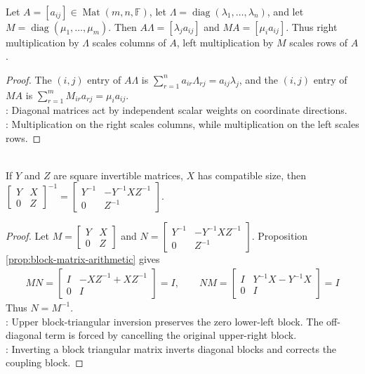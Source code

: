 \begin{proposition} \label{prop:diagonal-multiplication-scales-rows-columns} \\
Let $A=[a_{ij}]\in\operatorname{Mat}(m,n,\mathbb{F})$, let $\Lambda=\operatorname{diag}(\lambda_1,\ldots,\lambda_n)$, and let $M=\operatorname{diag}(\mu_1,\ldots,\mu_m)$. Then $A\Lambda=[\lambda_j a_{ij}]$ and $MA=[\mu_i a_{ij}]$. Thus right multiplication by $\Lambda$ scales columns of $A$, left multiplication by $M$ scales rows of $A$.
\begin{proof}
The $(i,j)$ entry of $A\Lambda$ is $\sum_{r=1}^n a_{ir}\Lambda_{rj}=a_{ij}\lambda_j$, and the $(i,j)$ entry of $MA$ is $\sum_{r=1}^m M_{ir}a_{rj}=\mu_i a_{ij}$.\\
: Diagonal matrices act by independent scalar weights on coordinate directions.\\
: Multiplication on the right scales columns, while multiplication on the left scales rows.
\end{proof}
\end{proposition}

\begin{proposition} \label{prop:block-upper-triangular-inverse} \\
If $Y$ and $Z$ are square invertible matrices, $X$ has compatible size, then $\begin{bmatrix}
Y & X\\
0 & Z
\end{bmatrix}^{-1}
=
\begin{bmatrix}
Y^{-1} & -Y^{-1}XZ^{-1}\\
0 & Z^{-1}
\end{bmatrix}$.
\begin{proof}
Let $M=\begin{bmatrix}Y&X\\0&Z\end{bmatrix}$ and $N=\begin{bmatrix}Y^{-1}&-Y^{-1}XZ^{-1}\\0&Z^{-1}\end{bmatrix}$. Proposition \ref{prop:block-matrix-arithmetic} gives
\begin{align}
MN=
\begin{bmatrix}
I&-XZ^{-1}+XZ^{-1}\\
0&I
\end{bmatrix}
=I,
\qquad
NM=
\begin{bmatrix}
I&Y^{-1}X-Y^{-1}X\\
0&I
\end{bmatrix}
=I \nonumber
\end{align}
Thus $N=M^{-1}$.\\
: Upper block-triangular inversion preserves the zero lower-left block. The off-diagonal term is forced by cancelling the original upper-right block.\\
: Inverting a block triangular matrix inverts diagonal blocks and corrects the coupling block.
\end{proof}
\end{proposition}

